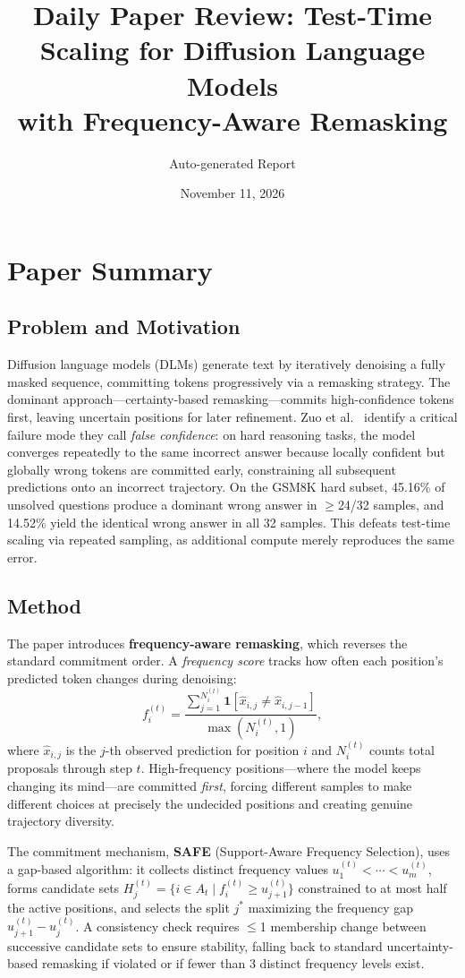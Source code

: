 \documentclass[11pt,a4paper]{article}
\title{Daily Paper Review: Test-Time Scaling for Diffusion Language Models\\with Frequency-Aware Remasking}
\author{Auto-generated Report}
\date{November 11, 2026}
\begin{document}
\maketitle

\section{Paper Summary}

\subsection{Problem and Motivation}
Diffusion language models (DLMs) generate text by iteratively denoising a fully masked sequence, committing tokens progressively via a remasking strategy. The dominant approach---certainty-based remasking---commits high-confidence tokens first, leaving uncertain positions for later refinement. Zuo et al.~\cite{zuo2026frequency} identify a critical failure mode they call \emph{false confidence}: on hard reasoning tasks, the model converges repeatedly to the same incorrect answer because locally confident but globally wrong tokens are committed early, constraining all subsequent predictions onto an incorrect trajectory. On the GSM8K hard subset, 45.16\% of unsolved questions produce a dominant wrong answer in $\geq$24/32 samples, and 14.52\% yield the identical wrong answer in all 32 samples. This defeats test-time scaling via repeated sampling, as additional compute merely reproduces the same error.

\subsection{Method}
The paper introduces \textbf{frequency-aware remasking}, which reverses the standard commitment order. A \emph{frequency score} tracks how often each position's predicted token changes during denoising:
\[
  f_i^{(t)} = \frac{\sum_{j=1}^{N_i^{(t)}} \mathbf{1}[\hat{x}_{i,j} \neq \hat{x}_{i,j-1}]}{\max(N_i^{(t)}, 1)},
\]
where $\hat{x}_{i,j}$ is the $j$-th observed prediction for position $i$ and $N_i^{(t)}$ counts total proposals through step $t$. High-frequency positions---where the model keeps changing its mind---are committed \emph{first}, forcing different samples to make different choices at precisely the undecided positions and creating genuine trajectory diversity.

The commitment mechanism, \textbf{SAFE} (Support-Aware Frequency Selection), uses a gap-based algorithm: it collects distinct frequency values $u_1^{(t)} < \cdots < u_m^{(t)}$, forms candidate sets $H_j^{(t)} = \{i \in A_t \mid f_i^{(t)} \geq u_{j+1}^{(t)}\}$ constrained to at most half the active positions, and selects the split $j^*$ maximizing the frequency gap $u_{j+1}^{(t)} - u_j^{(t)}$. A consistency check requires $\leq$1 membership change between successive candidate sets to ensure stability, falling back to standard uncertainty-based remasking if violated or if fewer than 3 distinct frequency levels exist.
\end{document}
